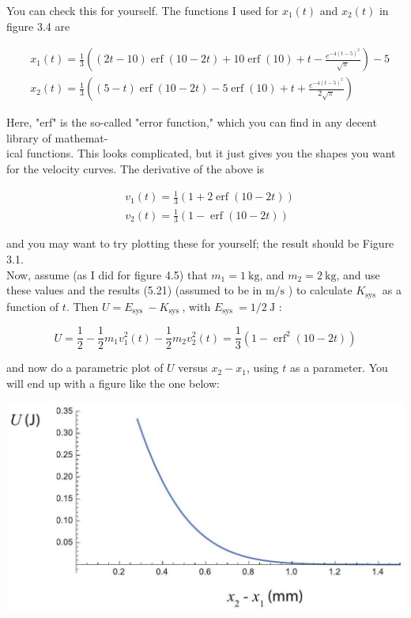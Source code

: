 \documentclass[10pt]{article}
\begin{document}
You can check this for yourself. The functions I used for $x_{1}(t)$ and $x_{2}(t)$ in figure 3.4 are


\begin{align*}
& x_{1}(t)=\frac{1}{3}\left((2 t-10) \operatorname{erf}(10-2 t)+10 \operatorname{erf}(10)+t-\frac{e^{-4(t-5)^{2}}}{\sqrt{\pi}}\right)-5 \\
& x_{2}(t)=\frac{1}{3}\left((5-t) \operatorname{erf}(10-2 t)-5 \operatorname{erf}(10)+t+\frac{e^{-4(t-5)^{2}}}{2 \sqrt{\pi}}\right) \tag{5.20}
\end{align*}


Here, "erf" is the so-called "error function," which you can find in any decent library of mathemat-\\
ical functions. This looks complicated, but it just gives you the shapes you want for the velocity curves. The derivative of the above is


\begin{align*}
& v_{1}(t)=\frac{1}{3}(1+2 \operatorname{erf}(10-2 t)) \\
& v_{2}(t)=\frac{1}{3}(1-\operatorname{erf}(10-2 t)) \tag{5.21}
\end{align*}


and you may want to try plotting these for yourself; the result should be Figure 3.1.\\
Now, assume (as I did for figure 4.5) that $m_{1}=1 \mathrm{~kg}$, and $m_{2}=2 \mathrm{~kg}$, and use these values and the results (5.21) (assumed to be in $\mathrm{m} / \mathrm{s}$ ) to calculate $K_{\text {sys }}$ as a function of $t$. Then $U=E_{\text {sys }}-K_{\text {sys }}$, with $E_{\text {sys }}=1 / 2 \mathrm{~J}$ :


\begin{equation*}
U=\frac{1}{2}-\frac{1}{2} m_{1} v_{1}^{2}(t)-\frac{1}{2} m_{2} v_{2}^{2}(t)=\frac{1}{3}\left(1-\operatorname{erf}^{2}(10-2 t)\right) \tag{5.22}
\end{equation*}


and now do a parametric plot of $U$ versus $x_{2}-x_{1}$, using $t$ as a parameter. You will end up with a figure like the one below:

\begin{center}
\includegraphics[max width=\textwidth]{2024_09_14_9969b06773f10b6936e8g-126}
\end{center}
\end{document}
